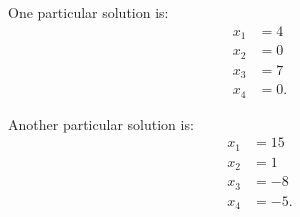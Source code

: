 {\begin{center}
\begin{minipage}{.4\linewidth}
One particular solution is:
\begin{align*} x_1 &= 4\\ x_2 &=0 \\ x_3 &= 7 \\ x_4 &= 0. \end{align*}
\end{minipage}
\begin{minipage}{.4\linewidth}
Another particular solution is:
\begin{align*} x_1 &= 15\\ x_2 &=1 \\ x_3 &= -8 \\ x_4 &= -5. \end{align*}
\end{minipage}
\end{center}
}\\

